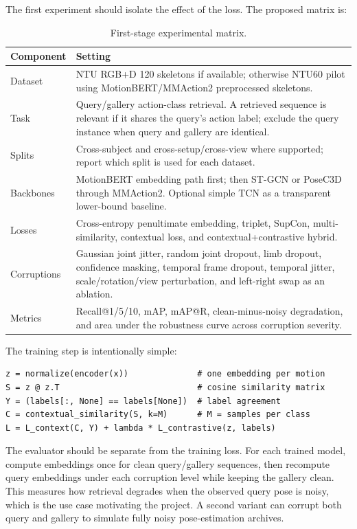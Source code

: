 \documentclass[11pt]{article}
\begin{document}
The first experiment should isolate the effect of the loss. The proposed matrix is:
\begin{table}[htbp]
\small
\centering
\caption{First-stage experimental matrix.}
\label{tab:experiment}
\begin{tabularx}{\textwidth}{@{}p{3.1cm}Y@{}}
\toprule
Component & Setting \\
\midrule
Dataset & NTU RGB+D 120 skeletons if available; otherwise NTU60 pilot using MotionBERT/MMAction2 preprocessed skeletons. \\
Task & Query/gallery action-class retrieval. A retrieved sequence is relevant if it shares the query's action label; exclude the query instance when query and gallery are identical. \\
Splits & Cross-subject and cross-setup/cross-view where supported; report which split is used for each dataset. \\
Backbones & MotionBERT embedding path first; then ST-GCN or PoseC3D through MMAction2. Optional simple TCN as a transparent lower-bound baseline. \\
Losses & Cross-entropy penultimate embedding, triplet, SupCon, multi-similarity, contextual loss, and contextual+contrastive hybrid. \\
Corruptions & Gaussian joint jitter, random joint dropout, limb dropout, confidence masking, temporal frame dropout, temporal jitter, scale/rotation/view perturbation, and left-right swap as an ablation. \\
Metrics & Recall@1/5/10, mAP, mAP@R, clean-minus-noisy degradation, and area under the robustness curve across corruption severity. \\
\bottomrule
\end{tabularx}
\end{table}

The training step is intentionally simple:
\begin{verbatim}
z = normalize(encoder(x))              # one embedding per motion
S = z @ z.T                            # cosine similarity matrix
Y = (labels[:, None] == labels[None])  # label agreement
C = contextual_similarity(S, k=M)      # M = samples per class
L = L_context(C, Y) + lambda * L_contrastive(z, labels)
\end{verbatim}

The evaluator should be separate from the training loss. For each trained model, compute embeddings once for clean query/gallery sequences, then recompute query embeddings under each corruption level while keeping the gallery clean. This measures how retrieval degrades when the observed query pose is noisy, which is the use case motivating the project. A second variant can corrupt both query and gallery to simulate fully noisy pose-estimation archives.
\end{document}
